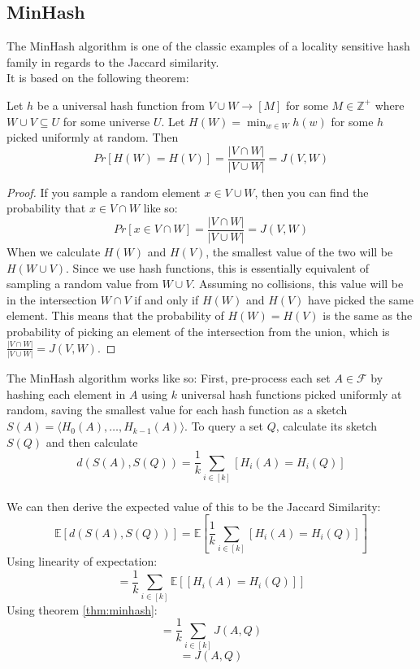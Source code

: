 \subsection{MinHash}
The MinHash algorithm is one of the classic examples of a locality sensitive hash family in regards to the Jaccard similarity.\\
It is based on the following theorem:
\begin{theorem}
    \label{thm:minhash}
    Let $h$ be a universal hash function from $V \cup W \rightarrow [M]$ for some $M \in \mathbb{Z}^+$ where $W\cup V\subseteq U$ for some universe $U$.
    Let $H(W)=\min_{w\in W} h(w)$ for some $h$ picked uniformly at random. Then
    $$Pr[H(W)=H(V)]=\frac{|V\cap W|}{|V \cup W|}= J(V,W)$$
\end{theorem}
\begin{proof}
    If you sample a random element $x \in V \cup W$, then you can find the probability that $x \in V\cap W$ like so:
    $$Pr[x\in V \cap W]=\frac{|V\cap W|}{|V \cup W|}= J(V,W)$$
    When we calculate $H(W)$ and $H(V)$, the smallest value of the two will be $H(W\cup V)$. Since we use hash functions, this is essentially equivalent of sampling a random value from $W\cup V$. Assuming no collisions, this value will be in the intersection $W\cap V$ if and only if $H(W)$ and $H(V)$ have picked the same element. This means that the probability of $H(W)=H(V)$ is the same as the probability of picking an element of the intersection from the union, which is $\frac{|V\cap W|}{|V\cup W|}=J(V,W)$.
\end{proof}
The MinHash algorithm works like so: First, pre-process each set $A\in \mathcal{F}$ by hashing each element in $A$ using $k$ universal hash functions picked uniformly at random, saving the smallest value for each hash function as a sketch $S(A)=\langle H_0(A), \dots, H_{k-1}(A)\rangle$.
To query a set $Q$, calculate its sketch $S(Q)$ and then calculate $$d(S(A),S(Q))=\frac{1}{k}\sum_{i\in [k]}[H_i(A)=H_i(Q)]$$\\
We can then derive the expected value of this to be the Jaccard Similarity:
$$\mathbb{E}[d(S(A),S(Q))]=\mathbb{E}[\frac{1}{k}\sum_{i\in [k]}[H_i(A)=H_i(Q)]]$$
Using linearity of expectation:
$$=\frac{1}{k}\sum_{i\in [k]}\mathbb{E}[[H_i(A)=H_i(Q)]]$$
Using theorem \ref{thm:minhash}:
$$=\frac{1}{k}\sum_{i\in [k]}J(A,Q)$$
$$=J(A,Q)$$
